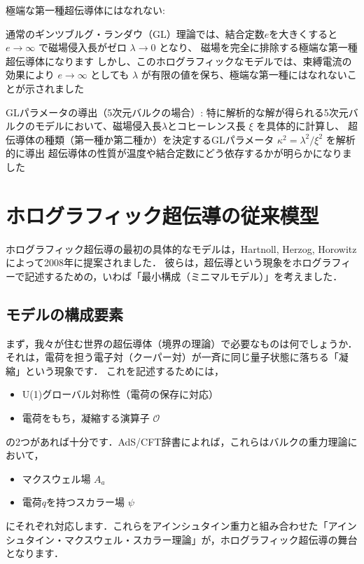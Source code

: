 \documentclass[b5paper,11pt,dvipdfmx]{jsarticle}
\numberwithin{equation}{section}
\theoremstyle{definition}
\begin{document}
極端な第一種超伝導体にはなれない:

通常のギンツブルグ・ランダウ（GL）理論では、結合定数$e$を大きくすると
$e\rightarrow\infty$ で磁場侵入長がゼロ $\lambda \to 0$ となり、
磁場を完全に排除する極端な第一種超伝導体になります
しかし、このホログラフィックなモデルでは、束縛電流の効果により
$e\rightarrow\infty$ としても $\lambda$ が有限の値を保ち、極端な第一種にはなれないことが示されました

GLパラメータの導出（5次元バルクの場合）:
特に解析的な解が得られる5次元バルクのモデルにおいて、磁場侵入長$\lambda$とコヒーレンス長 $\xi$ を具体的に計算し、
超伝導体の種類（第一種か第二種か）を決定するGLパラメータ $\kappa^2 = \lambda^2 / \xi^2$ を解析的に導出
超伝導体の性質が温度や結合定数にどう依存するかが明らかになりました



\section{ホログラフィック超伝導の従来模型}

ホログラフィック超伝導の最初の具体的なモデルは，Hartnoll, Herzog, Horowitzによって2008年に提案されました\cite{Hartnoll08a, Hartnoll08b}．
彼らは，超伝導という現象をホログラフィーで記述するための，いわば「最小構成（ミニマルモデル）」を考えました．

\subsection{モデルの構成要素}

まず，我々が住む世界の超伝導体（境界の理論）で必要なものは何でしょうか．
それは，電荷を担う電子対（クーパー対）が一斉に同じ量子状態に落ちる「凝縮」という現象です．
これを記述するためには，
\begin{itemize}
    \item U(1)グローバル対称性（電荷の保存に対応）
    \item 電荷をもち，凝縮する演算子 $\mathcal{O}$
\end{itemize}
の2つがあれば十分です．AdS/CFT辞書によれば，これらはバルクの重力理論において，
\begin{itemize}
    \item マクスウェル場 $A_a$
    \item 電荷$q$を持つスカラー場 $\psi$
\end{itemize}
にそれぞれ対応します．これらをアインシュタイン重力と組み合わせた「アインシュタイン・マクスウェル・スカラー理論」が，ホログラフィック超伝導の舞台となります．
\end{document}
